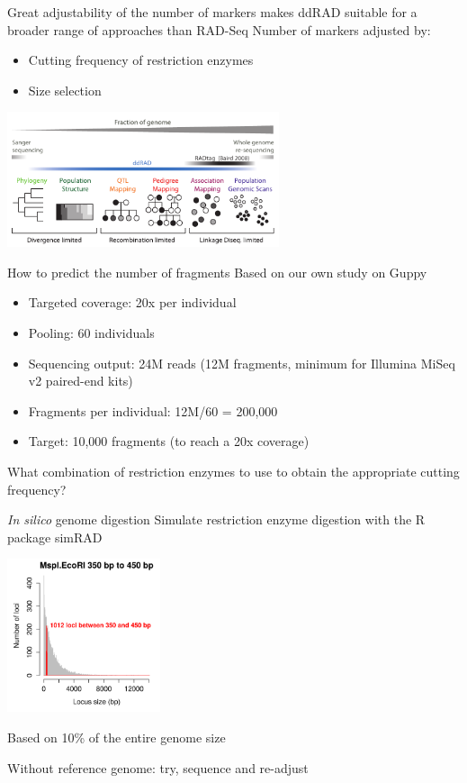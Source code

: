 \documentclass[presentation]{beamer}
\begin{document}
\begin{frame}[label=sec-2-2-4]{Great adjustability of the number of markers makes ddRAD suitable for a broader range of approaches than RAD-Seq}
Number of markers adjusted by:
\begin{itemize}
\item Cutting frequency of restriction enzymes
\item Size selection
\end{itemize}
\includegraphics[width=8cm]{Peterson-2012-Fig1.png}   
\begin{center}
\tiny{\citep{Peterson2012}}
\end{center}
\end{frame}
\begin{frame}[label=sec-2-2-5]{How to predict the number of fragments}
Based on our own study on Guppy
\begin{itemize}
\item Targeted coverage: 20x per individual
\item Pooling: 60 individuals
\item Sequencing output: 24M reads (12M fragments, minimum for Illumina MiSeq v2
paired-end kits)
\item Fragments per individual: 12M/60 = 200,000

\item Target: \alert{10,000} fragments (to reach a 20x coverage)
\end{itemize}

What combination of restriction enzymes to use to obtain the appropriate cutting
frequency?
\end{frame}
\begin{frame}[label=sec-2-2-6]{\emph{In silico} genome digestion}
Simulate restriction enzyme digestion with the R package simRAD \citep{Lepais2014}
\begin{center}
\includegraphics[width=4.5cm]{MspIEcoRI350to450.png}

\small{Based on 10\% of the entire genome size}
\end{center}
Without reference genome: try, sequence and re-adjust
\end{frame}
\end{document}
